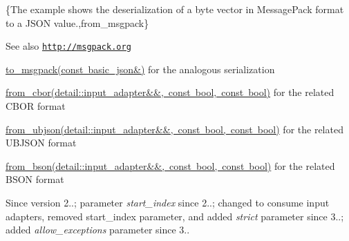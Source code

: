 \{The example shows the deserialization of a byte vector in Message\+Pack format to a J\+S\+ON value.,from\+\_\+msgpack\}

\begin{DoxySeeAlso}{See also}
\href{http://msgpack.org}{\tt http\+://msgpack.\+org} 

\mbox{\hyperlink{classnlohmann_1_1basic__json_a09ca1dc273d226afe0ca83a9d7438d9c}{to\+\_\+msgpack(const basic\+\_\+json\&)}} for the analogous serialization 

\mbox{\hyperlink{classnlohmann_1_1basic__json_a1d568ba1bd6978d80db42aa76626e2cf}{from\+\_\+cbor(detail\+::input\+\_\+adapter\&\&, const bool, const bool)}} for the related C\+B\+OR format 

\mbox{\hyperlink{classnlohmann_1_1basic__json_a1ed52b463d2ef14c85ed076467168c72}{from\+\_\+ubjson(detail\+::input\+\_\+adapter\&\&, const bool, const bool)}} for the related U\+B\+J\+S\+ON format 

\mbox{\hyperlink{classnlohmann_1_1basic__json_a0524486cd0b36a47448df882ec0d5e7b}{from\+\_\+bson(detail\+::input\+\_\+adapter\&\&, const bool, const bool)}} for the related B\+S\+ON format
\end{DoxySeeAlso}
\begin{DoxySince}{Since}
version 2..; parameter {\itshape start\+\_\+index} since 2..; changed to consume input adapters, removed start\+\_\+index parameter, and added {\itshape strict} parameter since 3..; added {\itshape allow\+\_\+exceptions} parameter since 3.. 
\end{DoxySince}
\mbox{\label{classnlohmann_1_1basic__json_a022b65246f82c87526940248dc9df6f5}} 
